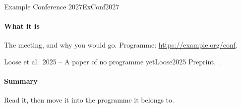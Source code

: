 \documentclass[11pt, a4paper]{article}
\begin{document}
\begin{confnote}{Example Conference 2027}{ExConf2027}

\paragraph{What it is}
The meeting, and why you would go. Programme: \url{https://example.org/conf}.

\end{confnote}

\begin{papernote}{Loose et al.\ 2025 -- A paper of no programme yet}{Loose2025}
Preprint, .

\paragraph{Summary}
Read it, then move it into the programme it belongs to.

\end{papernote}
\end{document}
